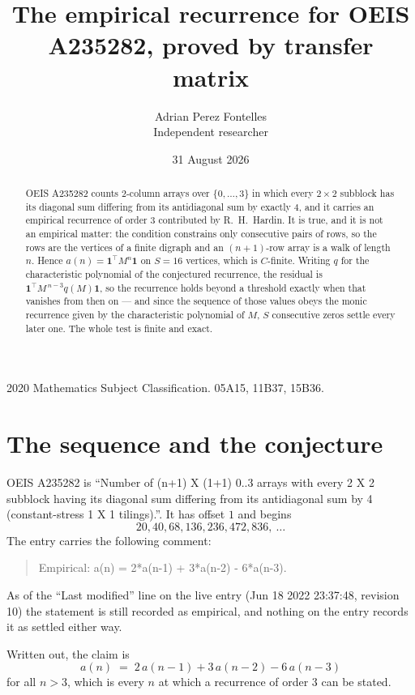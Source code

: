 \documentclass[11pt,a4paper]{article}
\title{The empirical recurrence for OEIS A235282, proved by transfer matrix}
\author{Adrian Perez Fontelles\\ \small Independent researcher}
\date{31 August 2026}
\theoremstyle{plain}
\theoremstyle{definition}
\begin{document}
\maketitle

\begin{abstract}
OEIS A235282 counts $2$-column arrays over $\{0,\dots,3\}$ in which every
$2\times2$ subblock has its diagonal sum differing from its antidiagonal sum by
exactly $4$, and it
carries an empirical recurrence of order $3$ contributed by R.~H.~Hardin. It is true,
and it is not an empirical matter: the condition constrains only consecutive pairs of rows,
so the rows are the vertices of a finite digraph and an $(n+1)$-row array is a walk of
length $n$. Hence $a(n)=\mathbf{1}^{\!\top}M^{n}\mathbf{1}$ on $S=16$ vertices, which
is $C$-finite. Writing $q$ for the characteristic polynomial of the conjectured recurrence,
the residual is $\mathbf{1}^{\!\top}M^{\,n-3}q(M)\mathbf{1}$, so the recurrence
holds beyond a threshold exactly when that vanishes from then on --- and since the sequence
of those values obeys the monic recurrence given by the characteristic polynomial of $M$,
$S$ consecutive zeros settle every later one. The whole test is finite and exact.
\end{abstract}

\noindent\small 2020 Mathematics Subject Classification. 05A15, 11B37, 15B36.\normalsize

\section{The sequence and the conjecture}

OEIS A235282 is ``Number of (n+1) X (1+1) 0..3 arrays with every 2 X 2 subblock having its diagonal sum differing from its antidiagonal sum by 4 (constant-stress 1 X 1 tilings).''. It has offset
$1$ and begins
\[
20, 40, 68, 136, 236, 472, 836,\ \dots
\]
The entry carries the following comment:
\begin{quote}\small
Empirical: a(n) = 2*a(n-1) + 3*a(n-2) - 6*a(n-3).
\end{quote}
As of the ``Last modified'' line on the live entry (Jun 18 2022 23:37:48, revision 10) the statement is
still recorded as empirical, and nothing on the entry records it as settled either way.

Written out, the claim is
\begin{equation}\label{eq:conj}
a(n)\;=\;2\,a(n-1) + 3\,a(n-2) - 6\,a(n-3)
\end{equation}
for all $n>3$, which is every $n$ at which a recurrence of order $3$ can be
stated.
\end{document}
